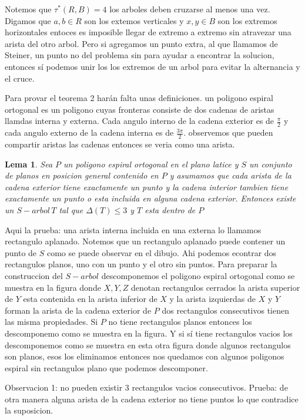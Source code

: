 \documentclass[11pt,a4paper]{article}
\newtheorem{lemma}{Lema}
\begin{document}
Notemos que $\tau^*(R, B) = 4$ los arboles deben cruzarse al menos una vez. Digamos que $a,b \in R$ son los extemos verticales y $x,y \in B$ son los extremos horizontales entoces es imposible llegar de extremo a extremo sin atravezar una arista del otro arbol. Pero si agregamos un punto extra, al que llamamos de Steiner, un punto no del problema sin para ayudar a encontrar la solucion, entonces sí podemos unir los los extremos de un arbol para evitar la alternancia y el cruce.

Para provar el teorema 2 harán falta unas definiciones. un poligono espiral ortogonal es un poligono cuyas fronteras consiste de dos cadenas de aristas llamdas interna y externa. Cada angulo interno de la cadena exterior es de $\frac{\pi }{2}$ y cada angulo externo de la cadena interna es de $\frac{3\pi }{2}$. observemos que pueden compartir aristas las cadenas entonces se veria como una arista.
\begin{lemma}
Sea $P$ un poligono espiral ortogonal en el plano latice y $S$ un conjunto de planos en posicion general contenido en $P$ y asumamos que cada arista de la cadena exterior tiene exactamente un punto y la cadena interior tambien tiene exactamente un punto o esta incluida en alguna cadena exterior. Entonces existe un $S-arbol \, T$  tal que $\Delta (T) \leq 3$ y $T$ esta dentro de $P$
\end{lemma}

Aqui la prueba: una arista interna incluida en una externa lo llamamos rectangulo aplanado. Notemos que un rectangulo aplanado puede contener un punto de $S$ como se puede observar en el dibujo. Ahi podemos econtrar dos rectangulos planos, uno con un punto y el otro sin puntos. Para preparar la construccion del $S-arbol$ descomponemos el poligono espiral ortogonal como se muestra en la figura donde $X, Y, Z$ denotan  rectangulos cerrados la arista superior de $Y$ esta contenida en la arista inferior de $X$ y la arista izquierdas de $X$ y $Y$ forman la arista de la cadena exterior de $P$ dos rectangulos consecutivos tienen las misma propiedades. Si $P$ no tiene rectangulos planos entonces los descomponemo como se muestra en la figura. Y si sí tiene rectangulos vacios los descomponemos como se muestra en esta otra figura donde algunos rectangulos son planos, esos los eliminamos entonces nos quedamos con algunos poligonos espiral sin rectangulos plano que podemos descomponer.

Observacion 1: no pueden existir 3 rectangulos vacios consecutivos.
Prueba: de otra manera alguna arista de la cadena exterior no tiene puntos lo que contradice la suposicion. 
\end{document}
